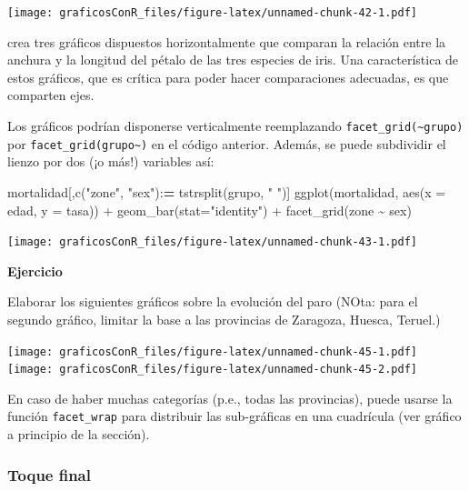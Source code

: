 \documentclass[
]{article}
\newenvironment{Shaded}{\begin{snugshade}}{\end{snugshade}}
\newcommand{\AttributeTok}[1]{\textcolor[rgb]{0.77,0.63,0.00}{#1}}
\newcommand{\ErrorTok}[1]{\textcolor[rgb]{0.64,0.00,0.00}{\textbf{#1}}}
\newcommand{\FunctionTok}[1]{\textcolor[rgb]{0.00,0.00,0.00}{#1}}
\newcommand{\NormalTok}[1]{#1}
\newcommand{\SpecialCharTok}[1]{\textcolor[rgb]{0.00,0.00,0.00}{#1}}
\newcommand{\StringTok}[1]{\textcolor[rgb]{0.31,0.60,0.02}{#1}}
\newcounter{ejcnt}[section]
\numberwithin{ejcnt}{section}
\newenvironment{ej}[1][]{%
	\refstepcounter{ejcnt}%
	\par\medskip%
	\noindent%
	\textbf{Ejercicio \theejcnt \;\;}%
	\rmfamily%
}{\medskip}
\begin{document}
\texttt{[image: graficosConR\_files/figure-latex/unnamed-chunk-42-1.pdf]}

crea tres gráficos dispuestos horizontalmente que comparan la relación entre la anchura y la longitud del pétalo de las tres especies de iris. Una característica de estos gráficos, que es crítica para poder hacer comparaciones adecuadas, es que comparten ejes.

Los gráficos podrían disponerse verticalmente reemplazando \texttt{facet\_grid(\textasciitilde{}grupo)} por \texttt{facet\_grid(grupo\textasciitilde{})} en el código anterior. Además, se puede subdividir el lienzo por dos (¡o más!) variables así:

\begin{Shaded}
\begin{Highlighting}[]
\NormalTok{mortalidad[,}\FunctionTok{c}\NormalTok{(}\StringTok{"zone"}\NormalTok{, }\StringTok{"sex"}\NormalTok{)}\SpecialCharTok{:}\ErrorTok{=} \FunctionTok{tstrsplit}\NormalTok{(grupo, }\StringTok{" "}\NormalTok{)]}
\FunctionTok{ggplot}\NormalTok{(mortalidad, }\FunctionTok{aes}\NormalTok{(}\AttributeTok{x =}\NormalTok{ edad, }\AttributeTok{y =}\NormalTok{ tasa)) }\SpecialCharTok{+} 
  \FunctionTok{geom\_bar}\NormalTok{(}\AttributeTok{stat=}\StringTok{"identity"}\NormalTok{) }\SpecialCharTok{+}
  \FunctionTok{facet\_grid}\NormalTok{(zone }\SpecialCharTok{\textasciitilde{}}\NormalTok{ sex)}
\end{Highlighting}
\end{Shaded}

\texttt{[image: graficosConR\_files/figure-latex/unnamed-chunk-43-1.pdf]}

\begin{ej}
Elaborar los siguientes gráficos sobre la evolución del paro (NOta: para
el segundo gráfico, limitar la base a las provincias de Zaragoza,
Huesca, Teruel.)
\end{ej}

\texttt{[image: graficosConR\_files/figure-latex/unnamed-chunk-45-1.pdf]} \texttt{[image: graficosConR\_files/figure-latex/unnamed-chunk-45-2.pdf]}

En caso de haber muchas categorías (p.e., todas las provincias), puede usarse la función \texttt{facet\_wrap} para distribuir las sub-gráficas en una cuadrícula (ver gráfico a principio de la sección).

\hypertarget{toque-final}{%
\subsubsection{Toque final}\label{toque-final}}
\end{document}
